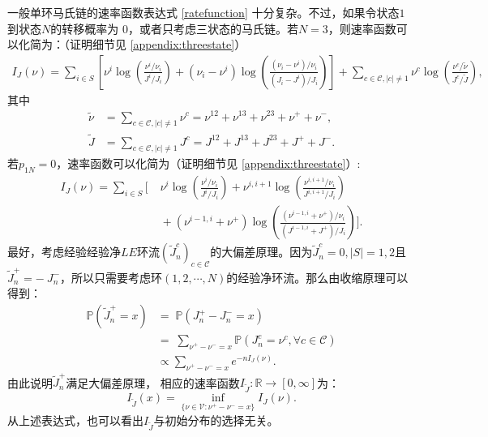 一般单环马氏链的速率函数表达式 \eqref{ratefunction} 十分复杂。不过，如果令状态$1$到状态$N$的转移概率为 0，或者只考虑三状态的马氏链。若$N=3$，则速率函数可以化简为：（证明细节见 \ref{appendix:threestate}）
\begin{align*}
    I_J(\nu) =
    \sum_{i\in S} \left[\nu^{i}\log \left(\frac{\nu^{i}/\nu_i}{J^i/J_i}\right) + (\nu_i - \nu^i)\log \left(\frac{(\nu_i - \nu^i)/\nu_i}{(J_i - J^i)/J_i} \right)
    \right]
    + \sum_{c\in\mathcal{C},|c|\neq 1} \nu^{c} \log \left(\frac{\nu^{c}/\tilde{\nu}}{J^c/\tilde{J}}\right) ,
\end{align*}
其中
\begin{align*}
    \tilde{\nu} &=\sum_{c\in\mathcal{C},|c|\neq 1}\nu^{c}
    = \nu^{12}+\nu^{13}+\nu^{23}+\nu^++\nu^-,\\
    \tilde{J} &=\sum_{c\in\mathcal{C},|c|\neq 1}J^{c}
    = J^{12}+J^{13}+J^{23}+J^++J^-.
\end{align*}
若$p_{1N}=0$，速率函数可以化简为（证明细节见 \ref{appendix:threestate}）:
\begin{equation}\label{lack}
    \begin{split}
        I_J(\nu) = \sum_{i\in S}\Bigg[&\;\nu^i\log\left(\frac{\nu^i/\nu_i}{J^i/J_i}\right)
        +\nu^{i,i+1}\log\left(\frac{\nu^{i,i+1}/\nu_i}{J^{i,i+1}/J_i}\right)\\
        &\;+\left(\nu^{i-1,i}+\nu^+\right)\log\left(\frac{\left(\nu^{i-1,i}+\nu^+\right)/\nu_i}
        {\left(J^{i-1,i}+J^+\right)/J_i}\right)\Bigg].
    \end{split}
\end{equation}
最好，考虑经验经验净$LE$环流$(\tilde{J}^{c}_n)_{c\in\mathcal{C}}$的大偏差原理。因为$\tilde{J}^c_n = 0, |S|=1,2$且$\tilde{J}^+_n = -\ {J}^-_n$，所以只需要考虑环$(1, 2, \cdots ,N)$的经验净环流。那么由收缩原理可以得到：
\begin{equation}\label{tilde I J}
	\begin{split}
		\mathbb{P}\left(\tilde{J}^{+}_n = x\right)
		&=\;\mathbb{P}\left(J^{+}_n-J^{-}_n = x\right)\\
		&=\;\sum_{\nu^{+}-\nu^{-}=x}\mathbb{P}\left(J^{c}_n=\nu^{c},\forall c\in\mathcal{C}\right)\\
		&\propto\sum_{\nu^{+}-\nu^{-}=x} e^{-nI_J(\nu)}.
	\end{split}
\end{equation}
由此说明$\tilde{J}^+_n$满足大偏差原理， 相应的速率函数$I_{\tilde{J}}:\mathbb{R}\rightarrow[0,\infty]$为：
\begin{equation*}
	I_{\tilde{J}}(x)=\inf_{\{\nu\in\mathcal{V}:\nu^{+}-\nu^{-}= x\}}I_J(\nu).
\end{equation*} 
从上述表达式，也可以看出$I_{\tilde{J}}$与初始分布的选择无关。

